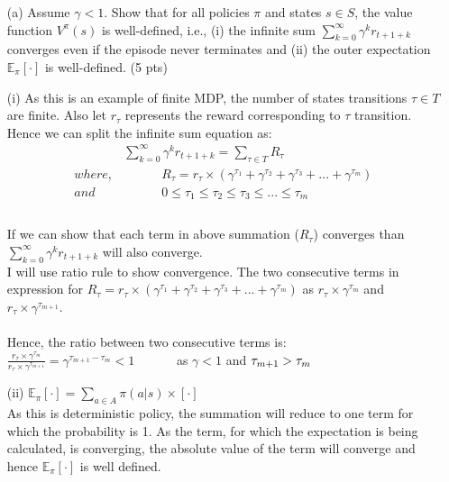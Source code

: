 \documentclass[12pt]{article}
\begin{document}
\begin{itemize}
\item[(a)] Assume $\gamma < 1$. Show that for all policies $\pi$ and states $s \in S$, the value function $V^\pi(s)$ is well-defined, i.e., (i) the infinite sum $\sum_{k=0}^\infty \gamma^kr_{t + 1 + k}$ converges even if the episode never terminates and (ii) the outer expectation $\mathbb{E}_\pi[\cdot]$ is well-defined. (5 pts)

\begin{solution}
(i) As this is an example of finite MDP, the number of states transitions $\tau \in T$ are finite. Also let $r_{\tau}$ represents the reward corresponding to $\tau$ transition. Hence we can split the infinite sum equation as:
\begin{align}
\hspace{3em} &\sum_{k=0}^\infty \gamma^k r_{t + 1 + k} = \sum_{\tau \in T} R_{\tau} \\
where,& \hspace{3em} R_{\tau} = r_{\tau}\times (\gamma^{\tau_1} +\gamma^{\tau_2} + \gamma^{\tau_3} + ... + \gamma^{\tau_m})\\
and& \hspace{3em} 0 \leq \tau_1 \leq \tau_2 \leq \tau_3 \leq ... \leq \tau_m \\ \\
\end{align}

If we can show that each term in above summation ($R_{\tau}$) converges than $\sum_{k=0}^\infty \gamma^k r_{t + 1 + k}$ will also converge. \\
I will use ratio rule to show convergence. The two consecutive terms in expression for $R_{\tau} = r_{\tau}\times (\gamma^{\tau_1} +\gamma^{\tau_2} + \gamma^{\tau_3} + ... + \gamma^{\tau_m})$ as $r_{\tau}\times\gamma^{\tau_m}$ and $r_{\tau}\times\gamma^{\tau_{m+1}}$.\\ \\
Hence, the ratio between two consecutive terms is: \\ 
$
\frac{r_{\tau}\times\gamma^{\tau_m}}{r_{\tau}\times\gamma^{\tau_{m+1}}} = \gamma^{\tau_{m+1} - \tau_{m}} < 1 \hspace{3em}$
as $\gamma < 1$ and $\tau_{m+1} > \tau_{m}\\
$

(ii) $\mathbb{E}_\pi[\cdot] = \sum_{a \in A} \pi(a|s) \times [\cdot]$ \\
As this is deterministic policy, the summation will reduce to one term for which the probability is 1. As the term, for which the expectation is being calculated, is converging, the absolute value of the term will converge and hence $\mathbb{E}_\pi[\cdot]$ is well defined.
\end{solution}



\end{itemize}
\end{document}
